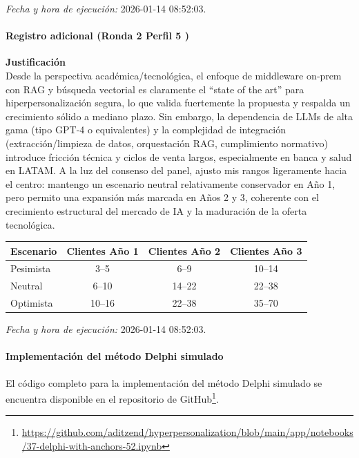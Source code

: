 \textit{Fecha y hora de ejecución:} 2026-01-14 08:52:03.

\paragraph{Registro adicional (Ronda 2 Perfil 5 )}

\textbf{Justificación}\\
Desde la perspectiva académica/tecnológica, el enfoque de middleware on‑prem con RAG y búsqueda vectorial es claramente el ``state of the art'' para hiperpersonalización segura, lo que valida fuertemente la propuesta y respalda un crecimiento sólido a mediano plazo. Sin embargo, la dependencia de LLMs de alta gama (tipo GPT‑4 o equivalentes) y la complejidad de integración (extracción/limpieza de datos, orquestación RAG, cumplimiento normativo) introduce fricción técnica y ciclos de venta largos, especialmente en banca y salud en LATAM. A la luz del consenso del panel, ajusto mis rangos ligeramente hacia el centro: mantengo un escenario neutral relativamente conservador en Año 1, pero permito una expansión más marcada en Años 2 y 3, coherente con el crecimiento estructural del mercado de IA y la maduración de la oferta tecnológica.

\begin{center}
\footnotesize
\begin{tabular}{|l|c|c|c|}
\hline
\textbf{Escenario} & \textbf{Clientes Año 1} & \textbf{Clientes Año 2} & \textbf{Clientes Año 3} \\
\hline
Pesimista & 3--5 & 6--9 & 10--14 \\
\hline
Neutral & 6--10 & 14--22 & 22--38 \\
\hline
Optimista & 10--16 & 22--38 & 35--70 \\
\hline
\end{tabular}
\end{center}

\textit{Fecha y hora de ejecución:} 2026-01-14 08:52:03.
\paragraph{Implementación del método Delphi simulado}

El código completo para la implementación del método Delphi simulado se encuentra disponible en el repositorio de GitHub\footnote{\url{https://github.com/aditzend/hyperpersonalization/blob/main/app/notebooks/37-delphi-with-anchors-52.ipynb}}.

